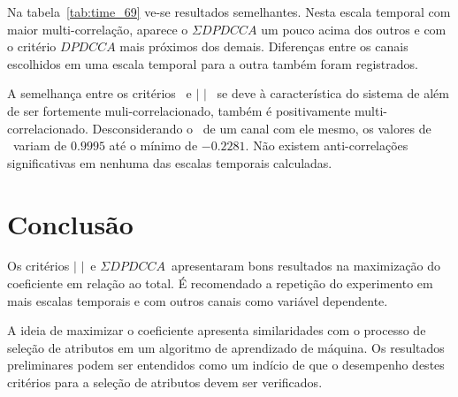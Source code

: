   Na tabela~\ref{tab:time_69} ve-se resultados semelhantes. Nesta escala temporal com maior multi-correlação, aparece o $\Sigma DPDCCA$ um pouco acima dos outros e com o critério $DPDCCA$ mais próximos dos demais. Diferenças entre os canais escolhidos em uma escala temporal para a outra também foram registrados.

  A semelhança entre os critérios \pdcca~e $|$ \pdcca $|$~ se deve à característica do sistema de além de ser fortemente muli-correlacionado, também é positivamente multi-correlacionado. Desconsiderando o \pdcca~de um canal com ele mesmo, os valores de \pdcca~variam de $0.9995$ até o mínimo de $-0.2281$. Não existem anti-correlações significativas em nenhuma das escalas temporais calculadas. 

  \section{Conclusão}

Os critérios $|$ \pdcca $|$~e $\Sigma DPDCCA$~apresentaram bons resultados na maximização do coeficiente \dmc em relação ao total. É recomendado a repetição do experimento em mais escalas temporais e com outros canais como variável dependente.

A ideia de maximizar o coeficiente apresenta similaridades com o processo de seleção de atributos em um algoritmo de aprendizado de máquina. Os resultados preliminares podem ser entendidos como um indício de que o desempenho destes critérios para a seleção de atributos devem ser verificados.


 

